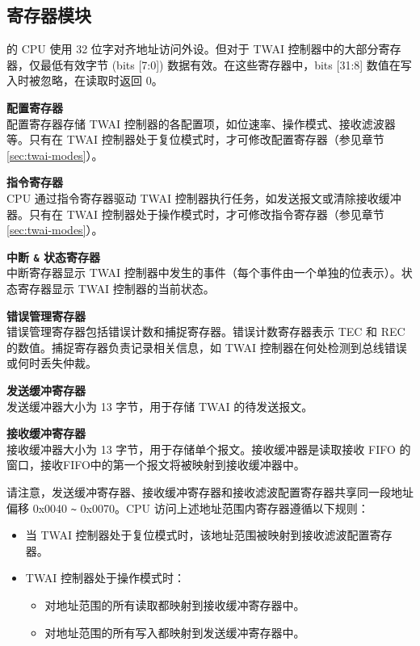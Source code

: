 \documentclass[main\_\_CN.tex]{subfiles}
\begin{document}
\subsection{寄存器模块}
\chipname{} 的 CPU 使用 32 位字对齐地址访问外设。但对于 TWAI 控制器中的大部分寄存器，仅最低有效字节 (bits [7:0]) 数据有效。在这些寄存器中，bits [31:8] 数值在写入时被忽略，在读取时返回 0。

{\bfseries 配置寄存器}\\
配置寄存器存储 TWAI 控制器的各配置项，如位速率、操作模式、接收滤波器等。只有在 TWAI 控制器处于复位模式时，才可修改配置寄存器（参见章节 \ref{sec:twai-modes}）。

{\bfseries 指令寄存器}\\
CPU 通过指令寄存器驱动 TWAI 控制器执行任务，如发送报文或清除接收缓冲器。只有在 TWAI 控制器处于操作模式时，才可修改指令寄存器（参见章节 \ref{sec:twai-modes}）。

{\bfseries 中断 \verb+&+ 状态寄存器}\\
中断寄存器显示 TWAI 控制器中发生的事件（每个事件由一个单独的位表示）。状态寄存器显示 TWAI 控制器的当前状态。

{\bfseries 错误管理寄存器}\\
错误管理寄存器包括错误计数和捕捉寄存器。错误计数寄存器表示 TEC 和 REC 的数值。捕捉寄存器负责记录相关信息，如 TWAI 控制器在何处检测到总线错误或何时丢失仲裁。

{\bfseries 发送缓冲寄存器}\\
发送缓冲器大小为 13 字节，用于存储 TWAI 的待发送报文。

{\bfseries 接收缓冲寄存器}\\
接收缓冲器大小为 13 字节，用于存储单个报文。接收缓冲器是读取接收 FIFO 的窗口，接收FIFO中的第一个报文将被映射到接收缓冲器中。

请注意，发送缓冲寄存器、接收缓冲寄存器和接收滤波配置寄存器共享同一段地址偏移 0x0040 \verb+~+ 0x0070。CPU 访问上述地址范围内寄存器遵循以下规则：

\begin{itemize}
    \item 当 TWAI 控制器处于复位模式时，该地址范围被映射到接收滤波配置寄存器。
    \item TWAI 控制器处于操作模式时：
    \begin{itemize}
        \item 对地址范围的所有读取都映射到接收缓冲寄存器中。
        \item 对地址范围的所有写入都映射到发送缓冲寄存器中。
    \end{itemize}
\end{itemize}
\end{document}

